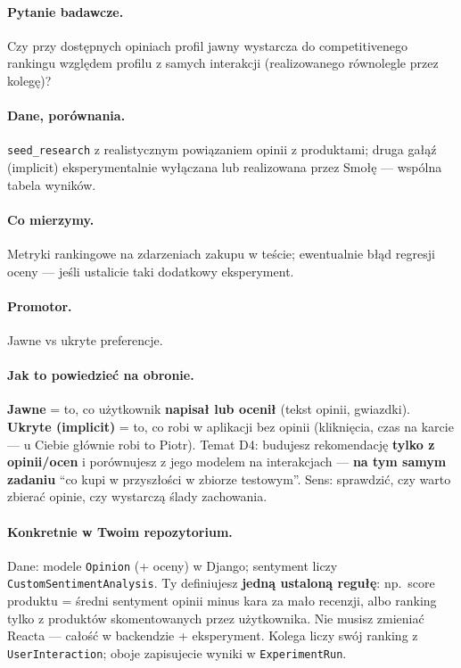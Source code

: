 \documentclass[a4paper,11pt]{article}
\newcommand{\code}[1]{\texttt{\small #1}}
\begin{document}
\paragraph{Pytanie badawcze.}
Czy przy dostępnych opiniach profil jawny wystarcza do competitivenego rankingu względem profilu z samych interakcji (realizowanego równolegle przez kolegę)?

\paragraph{Dane, porównania.}
\texttt{seed\_research} z realistycznym powiązaniem opinii z produktami; druga gałąź (implicit) eksperymentalnie wyłączana lub realizowana przez Smołę --- wspólna tabela wyników.

\paragraph{Co mierzymy.}
Metryki rankingowe na zdarzeniach zakupu w teście; ewentualnie błąd regresji oceny --- jeśli ustalicie taki dodatkowy eksperyment.

\paragraph{Promotor.}
Jawne vs ukryte preferencje.

\paragraph{Jak to powiedzieć na obronie.}
\textbf{Jawne} = to, co użytkownik \textbf{napisał lub ocenił} (tekst opinii, gwiazdki). \textbf{Ukryte (implicit)} = to, co robi w aplikacji bez opinii (kliknięcia, czas na karcie --- u Ciebie głównie robi to Piotr). Temat D4: budujesz rekomendację \textbf{tylko z opinii/ocen} i porównujesz z jego modelem na interakcjach --- \textbf{na tym samym zadaniu} ``co kupi w przyszłości w zbiorze testowym''. Sens: sprawdzić, czy warto zbierać opinie, czy wystarczą ślady zachowania.

\paragraph{Konkretnie w Twoim repozytorium.}
Dane: modele \code{Opinion} (+ oceny) w Django; sentyment liczy \code{CustomSentimentAnalysis}. Ty definiujesz \textbf{jedną ustaloną regułę}: np.\ score produktu = średni sentyment opinii minus kara za mało recenzji, albo ranking tylko z produktów skomentowanych przez użytkownika. Nie musisz zmieniać Reacta --- całość w backendzie + eksperyment. Kolega liczy swój ranking z \code{UserInteraction}; oboje zapisujecie wyniki w \code{ExperimentRun}.
\end{document}
